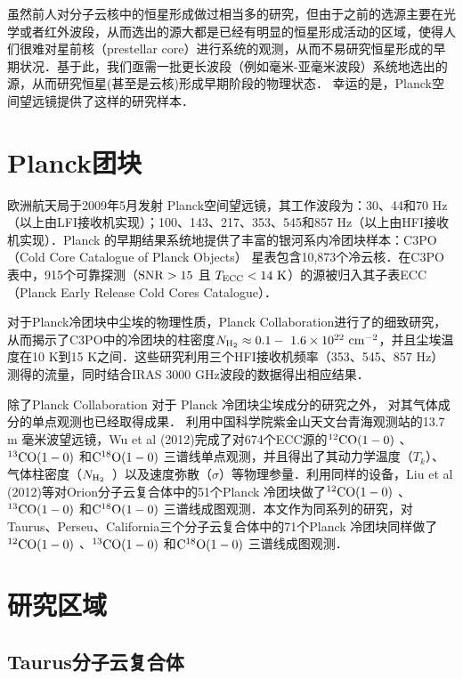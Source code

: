 \documentclass[UTF8, nocolorlinks]{pkuthss}
\newcommand{\coaa}{$\rm^{12}CO(1-0)$ }
\newcommand{\cobb}{$\rm^{13}CO(1-0)$ }
\newcommand{\cocc}{$\rm C^{18}O(1-0)$ }
\newcommand{\nhyd}{$N_{\rm H_2}$\ }
\begin{document}
		虽然前人对分子云核中的恒星形成做过相当多的研究，但由于之前的选源主要在光学或者红外波段，从而选出的源大都是已经有明显的恒星形成活动的区域，使得人们很难对星前核（prestellar core）进行系统的观测，从而不易研究恒星形成的早期状况．基于此，我们亟需一批更长波段（例如毫米-亚毫米波段）系统地选出的源，从而研究恒星(甚至是云核)形成早期阶段的物理状态． 幸运的是，Planck空间望远镜提供了这样的研究样本．

	\section{Planck团块}

		欧洲航天局于2009年5月发射 Planck空间望远镜，其工作波段为：30、44和70 Hz（以上由LFI接收机实现）；100、143、217、353、545和857 Hz（以上由HFI接收机实现）\supercite{2011A&A...536A...1P}．Planck 的早期结果系统地提供了丰富的银河系内冷团块样本：C3PO（Cold Core Catalogue of Planck Objects） 星表包含10,873个冷云核\supercite{2011yCat.8088....0P,2011A&A...536A..23P}．在C3PO表中，915个可靠探测（$\rm SNR>15$ 且 $T_{\rm ECC}<14\rm\ K$）的源被归入其子表ECC（Planck Early Release Cold Cores Catalogue）\supercite{2011yCat.8088....0P,2011A&A...536A..23P}．

		对于Planck冷团块中尘埃的物理性质，Planck Collaboration进行了的细致研究，从而揭示了C3PO中的冷团块的柱密度$N_ {\rm H_2} \approx 0.1 \rm - \ 1.6 \times 10^{22} \rm\ cm^{-2}$，并且尘埃温度在10 K到15 K之间\supercite{2011A&A...536A..23P}．这些研究利用三个HFI接收机频率（353、545、857 Hz）测得的流量，同时结合IRAS 3000 GHz波段的数据得出相应结果\supercite{2011A&A...536A..23P,2011A&A...536A..22P}．

		除了Planck Collaboration 对于 Planck 冷团块尘埃成分的研究之外， 对其气体成分的单点观测也已经取得成果． 利用中国科学院紫金山天文台青海观测站的13.7 m 毫米波望远镜，Wu et al (2012)完成了对674个ECC源的\coaa 、\cobb  和\cocc  三谱线单点观测，并且得出了其动力学温度（$T_k$）、气体柱密度（\nhyd）以及速度弥散（$\sigma$）等物理参量\supercite{wu2012gas}．利用同样的设备，Liu et al (2012)等对Orion分子云复合体中的51个Planck 冷团块做了\coaa 、\cobb  和\cocc  三谱线成图观测\supercite{LiuTie}．本文作为同系列的研究，对Taurus、Perseu、California三个分子云复合体中的71个Planck 冷团块同样做了\coaa 、\cobb  和\cocc  三谱线成图观测．

	\section{研究区域}\label{Sec.TPC}

		\subsection{Taurus分子云复合体}
\end{document}
